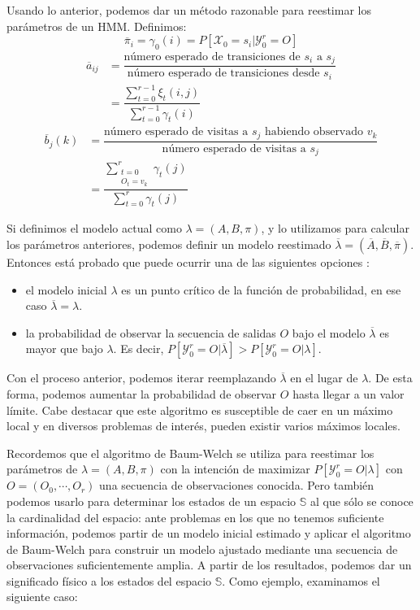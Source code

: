 Usando lo anterior, podemos dar un método razonable para reestimar los parámetros de un HMM. Definimos:
\[\overline{\pi}_i=\gamma_0(i)=P[\mathcal{X}_0=s_i|\mathcal{Y}_0^r=O]\]
\begin{align*}
    \overline{a}_{ij}&=\dfrac{\text{número esperado de transiciones de $s_i$ a $s_j$}}{\text{número esperado de transiciones desde $s_i$}} \\
    &=\dfrac{\displaystyle\sum_{t=0}^{r-1}\xi_t(i,j)}{\displaystyle\sum_{t=0}^{r-1}\gamma_t(i)}
\end{align*}
\begin{align*}
    \overline{b}_j(k)&=\dfrac{\text{número esperado de visitas a $s_j$ habiendo observado $v_k$}}{\text{número esperado de visitas a $s_j$}}\\
    &=\dfrac{\displaystyle\sum_{\substack{t=0 \\ O_t=v_k}}^{r}\gamma_t(j)}{\displaystyle\sum_{t=0}^{r}\gamma_t(j)}
\end{align*}

Si definimos el modelo actual como $\lambda=(A,B,\pi)$, y lo utilizamos para calcular los parámetros anteriores, podemos definir un modelo reestimado $\overline{\lambda}=(\overline{A},\overline{B},\overline{\pi})$. Entonces está probado que puede ocurrir una de las siguientes opciones \cite{Rabiner}:
\begin{itemize}
    \item el modelo inicial $\lambda$ es un punto crítico de la función de probabilidad, en ese caso $\overline{\lambda}=\lambda$.
    \item la probabilidad de observar la secuencia de salidas $O$ bajo el modelo $\overline{\lambda}$ es mayor que bajo $\lambda$. Es decir, $P[\mathcal{Y}_0^r=O|\overline{\lambda}]>P[\mathcal{Y}_0^r=O|\lambda]$.
\end{itemize}

Con el proceso anterior, podemos iterar reemplazando $\overline{\lambda}$ en el lugar de $\lambda$. De esta forma, podemos aumentar la probabilidad de observar $O$ hasta llegar a un valor límite. Cabe destacar que este algoritmo es susceptible de caer en un máximo local y en diversos problemas de interés, pueden existir varios máximos locales.

Recordemos que el algoritmo de Baum-Welch se utiliza para reestimar los parámetros de $\lambda=(A,B,\pi)$ con la intención de maximizar $P[\mathcal{Y}_0^r=O|\lambda]$ con $O=(O_0,\cdots,O_r)$ una secuencia de observaciones conocida. Pero también podemos usarlo para determinar los estados de un espacio $\mathbb{S}$ al que sólo se conoce la cardinalidad del espacio: ante problemas en los que no tenemos suficiente información, podemos partir de un modelo inicial estimado y aplicar el algoritmo de Baum-Welch para construir un modelo ajustado mediante una secuencia de observaciones suficientemente amplia. A partir de los resultados, podemos dar un significado físico a los estados del espacio $\mathbb{S}$. Como ejemplo, examinamos el siguiente caso: 


